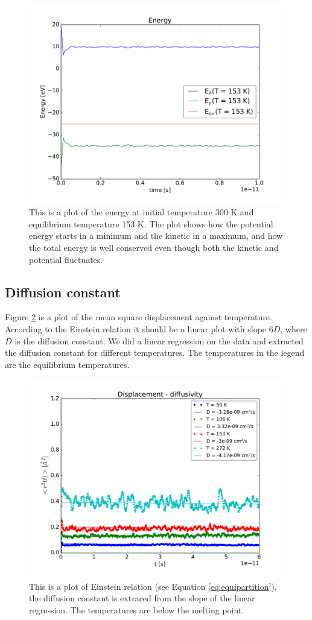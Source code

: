 \begin{figure}[H]
\center
\includegraphics[width=0.8\linewidth]{../figures/energy}\caption{This is a plot of the energy at initial temperature 300 K and equilibrium temperature 153 K. The plot shows how the potential energy starts in a minimum and the kinetic in a maximum, and how the total energy is well conserved even though both the kinetic and potential fluctuates.}\label{fig:energy}
\end{figure}

\subsection{Diffusion constant}

Figure \ref{fig:below_melting} is a plot of the mean square displacement against temperature. According to the Einstein relation it should be a linear plot with slope $6D$, where $D$ is the diffusion constant. We did a linear regression on the data and extracted the diffusion constant for different temperatures. The temperatures in the legend are the equilibrium temperatures.


\begin{figure}[H]
\center
\includegraphics[width=0.8\linewidth]{../figures/below_melting}\caption{This is a plot of Einstein relation (see Equation \ref{eq:equipartition}), the diffusion constant is extraced from the slope of the linear regression. The temperatures are below the melting point.}\label{fig:below_melting}
\end{figure}


